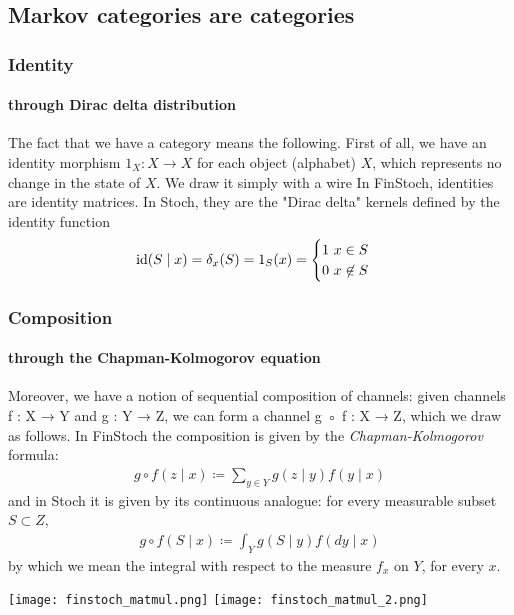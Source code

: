 \subsection{Markov categories are categories}

\begin{frame}
    \frametitle{Identity}
    \framesubtitle{through Dirac delta distribution}
    The fact that we have a category means the following. First of all, we have an identity morphism $1_X: X\to X$ for each object (alphabet) $X$, which represents no change in the state of $X$. We draw it simply with a wire
    In FinStoch, identities are identity matrices. In Stoch, they are the "Dirac delta" kernels defined by the identity function
    \[
        \text{\normalfont id} (S\mid x) = \delta_x (S) = 1_S(x) = \begin{cases} 1\ x\in S\\ 0\ x\not \in S
        \end{cases}
    \]
\end{frame}

\begin{frame}
    \frametitle{Composition}
    \framesubtitle{through the Chapman-Kolmogorov equation}
    Moreover, we have a notion of sequential composition of channels: given channels f : X → Y and g : Y → Z, we can form a channel g ◦ f : X → Z, which we draw as follows.
    In FinStoch the composition is given by the \emph{Chapman-Kolmogorov} formula:
    \begin{align}
        g\circ f (z\mid x) \coloneqq \sum_{y\in Y} g(z\mid y) f(y\mid x)
    \end{align}
    and in Stoch it is given by its continuous analogue: for every measurable subset $S\subset Z$,
    \begin{align}
        g\circ f (S\mid x) \coloneqq \int_Y g(S\mid y) f(dy\mid x)
    \end{align}
    by which we mean the integral with respect to the measure $f_x$ on $Y$, for every $x$.
\end{frame}

\begin{frame}
    \texttt{[image: finstoch\_matmul.png]}
    \texttt{[image: finstoch\_matmul\_2.png]}
    
\end{frame}

